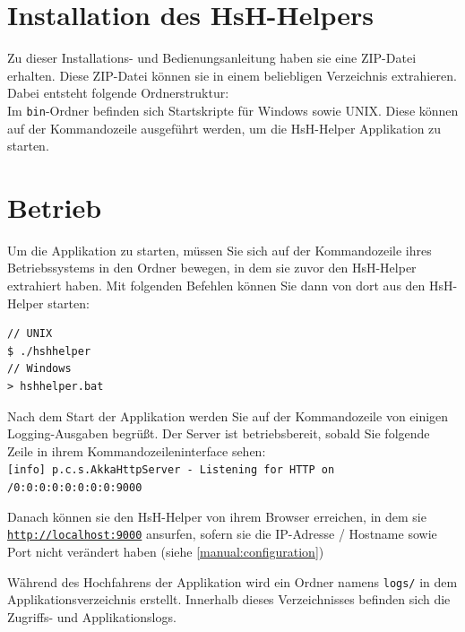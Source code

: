 \documentclass[12pt,DIV14,BCOR10mm,a4paper,parskip=half-,headsepline,headinclude,english,ngerman,bibliography=totocnumbered]{scrreprt}
\begin{document}
\vspace*{-3cm}

\tableofcontents  %

\chapter{Installation des HsH-Helpers}

Zu dieser Installations- und Bedienungsanleitung haben sie eine ZIP-Datei erhalten.
Diese ZIP-Datei können sie in einem beliebligen Verzeichnis extrahieren.
Dabei entsteht folgende Ordnerstruktur: \\
\bigskip
Im \texttt{bin}-Ordner befinden sich Startskripte für Windows sowie UNIX.
Diese können auf der Kommandozeile ausgeführt werden, um die HsH-Helper Applikation zu starten.

\chapter{Betrieb}

Um die Applikation zu starten, müssen Sie sich auf der Kommandozeile ihres Betriebssystems in den Ordner bewegen, in dem sie zuvor den HsH-Helper extrahiert haben.
Mit folgenden Befehlen können Sie dann von dort aus den HsH-Helper starten:

\begin{lstlisting}[label=server-operation, caption={Kommandozeilenbefehle zum Ausführen der Applikation}, captionpos=b]
// UNIX
$ ./hshhelper
// Windows
> hshhelper.bat
\end{lstlisting}

Nach dem Start der Applikation werden Sie auf der Kommandozeile von einigen Logging-Ausgaben begrüßt.
Der Server ist betriebsbereit, sobald Sie folgende Zeile in ihrem Kommandozeileninterface sehen: \\
\texttt{[info] p.c.s.AkkaHttpServer - Listening for HTTP on /0:0:0:0:0:0:0:0:9000}

Danach können sie den HsH-Helper von ihrem Browser erreichen, in dem sie \texttt{\url{http://localhost:9000}} ansurfen, sofern sie die IP-Adresse / Hostname sowie Port nicht verändert haben (siehe \autoref{manual:configuration})

Während des Hochfahrens der Applikation wird ein Ordner namens \texttt{logs/} in dem Applikationsverzeichnis erstellt.
Innerhalb dieses Verzeichnisses befinden sich die Zugriffs- und Applikationslogs.
\end{document}

